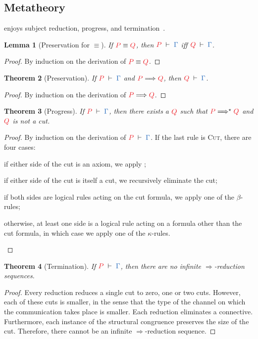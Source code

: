 \documentclass[submission,copyright,creativecommons]{eptcs}
\newtheorem{lemma}{Lemma}
\newtheorem{theorem}[lemma]{Theorem}
\begin{document}
\subsection{Metatheory}
\cp enjoys subject reduction, progress, and termination~\citep{wadler2012}.
\begin{lemma}[Preservation for $\equiv$]\label{lem:cp-preservation-equiv}
  If $\tm{P}\equiv\tm{Q}$, then $\seq[P]{\Gamma}$ iff $\seq[Q]{\Gamma}$.
\end{lemma}\vspace*{-0.75\baselineskip}%
\begin{proof}
  By induction on the derivation of $\tm{P}\equiv\tm{Q}$.
\end{proof}
\begin{theorem}[Preservation]\label{thm:cp-preservation}
  If $\seq[P]{\Gamma}$ and $\reducesto{P}{Q}$, then $\seq[Q]{\Gamma}$.
\end{theorem}\vspace*{-0.75\baselineskip}%
\begin{proof}
  By induction on the derivation of $\reducesto{P}{Q}$.
\end{proof}%
\begin{theorem}[Progress]\label{thm:cp-progress}
  If $\seq[P]{\Gamma}$, then there exists a $\tm{Q}$ such that
  $\tm{P}\Longrightarrow^\star\tm{Q}$ and $\tm{Q}$ is not a cut.
\end{theorem}\vspace*{-0.75\baselineskip}%
\begin{proof}
  By induction on the derivation of $\seq[P]{\Gamma}$. If the last rule is \textsc{Cut}, there are four cases:
  \begin{enumerate*}[label={\alph*)}]
  \item
    if either side of the cut is an axiom, we apply ;
  \item
    if either side of the cut is itself a cut, we recursively eliminate the cut;
  \item
    if both sides are logical rules acting on the cut formula, we apply
    one of the $\beta$-rules;
  \item
    otherwise, at least one side is a logical rule acting on a formula other
    than the cut formula, in which case we apply one of the $\kappa$-rules.
  \end{enumerate*}
\end{proof}%
\begin{theorem}[Termination]\label{thm:cp-termination}
  If $\seq[P]{\Gamma}$, then there are no infinite $\Longrightarrow$-reduction sequences.
\end{theorem}\vspace*{-0.75\baselineskip}%
\begin{proof}
  Every reduction reduces a single cut to zero, one or two cuts. However, each of these cuts is smaller, in the sense that the type of the channel on which the communication takes place is smaller. Each reduction eliminates a connective. Furthermore, each instance of the structural congruence preserves the size of the cut. Therefore, there cannot be an infinite $\Longrightarrow$-reduction sequence.
\end{proof}
\end{document}
